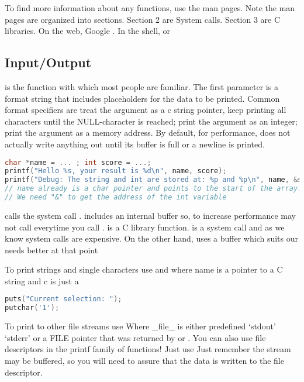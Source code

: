 To find more information about any functions, use the man pages. Note the man pages are organized into sections. Section 2 are System calls. Section 3 are C libraries. On the web, Google . In the shell,  or 

\subsection{Input/Output}

 is the function with which most people are familiar. The first parameter is a format string that includes placeholders for the data to be printed. Common format specifiers are  treat the argument as a c string pointer, keep printing all characters until the NULL-character is reached;  print the argument as an integer;  print the argument as a memory address. By default, for performance,  does not actually write anything out until its buffer is full or a newline is printed.

\begin{lstlisting}[language=C]
char *name = ... ; int score = ...;
printf("Hello %s, your result is %d\n", name, score);
printf("Debug: The string and int are stored at: %p and %p\n", name, &score );
// name already is a char pointer and points to the start of the array. 
// We need "&" to get the address of the int variable
\end{lstlisting}

 calls the system call .  includes an internal buffer so, to increase performance  may not call  everytime you call .  is a C library function.  is a system call and as we know system calls are expensive. On the other hand,  uses a buffer which suits our needs better at that point

To print strings and single characters use  and  where name is a pointer to a C string and c is just a 

\begin{lstlisting}[language=C]
puts("Current selection: ");
putchar('1');
\end{lstlisting}

To print to other file streams use  Where \_file\_ is either predefined `stdout' `stderr' or a FILE pointer that was returned by  or . You can also use file descriptors in the printf family of functions! Just use  Just remember the stream may be buffered, so you will need to assure that the data is written to the file descriptor.

